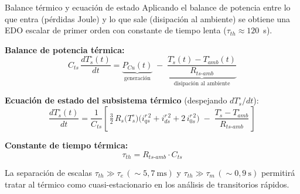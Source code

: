 \documentclass[aspectratio=169,t]{beamer}
\begin{document}
\begin{frame}{Balance térmico y ecuación de estado}
{\small\color{uncGray}Aplicando el balance de potencia entre lo que entra (pérdidas Joule) y lo que sale (disipación al ambiente) se obtiene una EDO escalar de primer orden con constante de tiempo lenta ($\tau_{th}\approx 120$~s).}\par
\vspace{3mm}

\textbf{Balance de potencia térmica:}
\begin{equation*}
C_{ts}\,\frac{dT_s^\circ(t)}{dt} = \underbrace{P_{Cu}(t)}_{\text{generación}} \;-\; \underbrace{\frac{T_s^\circ(t) - T_{amb}^\circ(t)}{R_{ts\text{-}amb}}}_{\text{disipación al ambiente}}
\end{equation*}

\textbf{Ecuación de estado del subsistema térmico} (despejando $dT_s^\circ/dt$):
\begin{equation*}
\frac{dT_s^\circ(t)}{dt} = \frac{1}{C_{ts}}\!\left[\,\tfrac{3}{2}\,R_s\!\big(T_s^\circ\big)\big(i_{qs}^{r\,2}+i_{ds}^{r\,2}+2\,i_{0s}^{r\,2}\big) \;-\; \frac{T_s^\circ - T_{amb}^\circ}{R_{ts\text{-}amb}}\,\right]
\end{equation*}

\textbf{Constante de tiempo térmica:}
\begin{equation*}
\tau_{th} = R_{ts\text{-}amb}\cdot C_{ts}
\end{equation*}

{\small La separación de escalas $\tau_{th} \gg \tau_e\,(\sim 5{,}7~\text{ms})$ y $\tau_{th} \gg \tau_m\,(\sim 0{,}9~\text{s})$ permitirá tratar al térmico como cuasi-estacionario en los análisis de transitorios rápidos.}
\end{frame}
\end{document}
